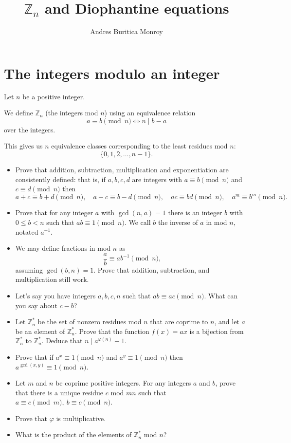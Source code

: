 \documentclass{article}
\title{$\mathbb Z_n$ and Diophantine equations}
\author{Andres Buritica Monroy}
\date{}
\begin{document}
\maketitle
\section{The integers modulo an integer}
  Let $n$ be a positive integer.

  We define $\mathbb Z_n$ (the integers mod $n$) using an equivalence relation
  \[a\equiv b\pmod n\iff n\mid b-a\]
  over the integers.

  This gives us $n$ equivalence classes corresponding to the least residues mod
  $n$: \[\{0,1,2,\ldots,n-1\}.\]
  \begin{itemize}
    \item Prove that addition, subtraction, multiplication and exponentiation
      are consistently defined: that
      is, if $a,b,c,d$ are integers with $a\equiv b\pmod n$ and $c\equiv d\pmod
      n$ then \[a+c\equiv b+d\pmod n,\quad a-c\equiv b-d\pmod n,\quad ac\equiv
        bd\pmod n,\quad a^m\equiv b^m\pmod n.\]
    \item Prove that for any integer $a$ with $\gcd(n,a)=1$ there is an integer $b$
      with $0\le b<n$ such that $ab\equiv 1\pmod n$. We call $b$ the inverse of
      $a$ in mod $n$, notated $a^{-1}$.
    \item We may define fractions in mod $n$ as \[\frac ab\equiv ab^{-1}\pmod n,\]
      assuming $\gcd(b,n)=1$. Prove that addition, subtraction, and
      multiplication still work.
    \item Let's say you have integers $a,b,c,n$ such that $ab\equiv ac\pmod n$.
      What can you say about $c-b$?
    \item Let $\mathbb Z_n^*$ be the set of nonzero residues mod $n$ that are
      coprime to $n$, and let $a$ be an
      element of $\mathbb Z_n^*$. Prove that the function $f(x)=ax$ is a
      bijection from $\mathbb Z_n^*$ to $\mathbb Z_n^*$. Deduce that $n\mid
      a^{\varphi(n)}-1$.
    \item Prove that if $a^x\equiv 1\pmod n$ and $a^y\equiv 1\pmod n$ then
      $a^{\gcd(x,y)}\equiv 1\pmod n$.
    \item Let $m$ and $n$ be coprime positive integers. For any integers $a$ and
      $b$, prove that there is a unique residue $c$ mod $mn$ such that $a\equiv
      c\pmod m,\ b\equiv c\pmod n$.
    \item Prove that $\varphi$ is multiplicative.
    \item What is the product of the elements of $\mathbb Z_n^*$ mod $n$?
  \end{itemize}
  \newpage
\end{document}
